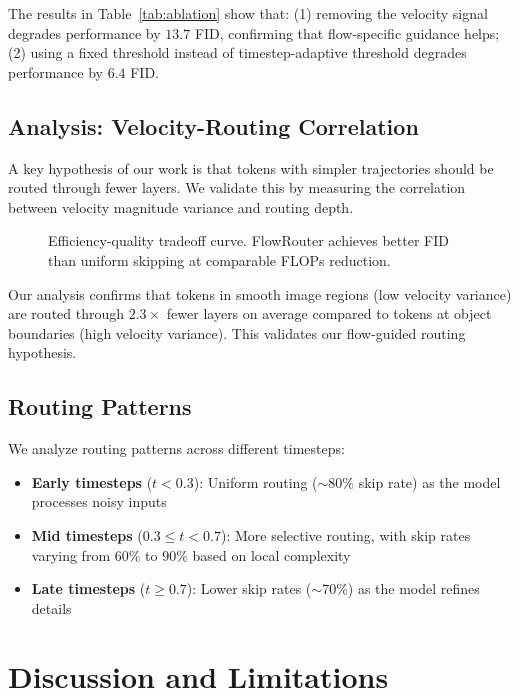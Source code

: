 \documentclass{article}
\begin{document}
The results in Table~\ref{tab:ablation} show that: (1) removing the velocity signal degrades performance by $13.7$ FID, confirming that flow-specific guidance helps; (2) using a fixed threshold instead of timestep-adaptive threshold degrades performance by $6.4$ FID.

\subsection{Analysis: Velocity-Routing Correlation}

A key hypothesis of our work is that tokens with simpler trajectories should be routed through fewer layers. We validate this by measuring the correlation between velocity magnitude variance and routing depth.

\begin{figure}[t]
\centering
{}
\caption{Efficiency-quality tradeoff curve. FlowRouter achieves better FID than uniform skipping at comparable FLOPs reduction.}
\label{fig:efficiency}
\end{figure}

Our analysis confirms that tokens in smooth image regions (low velocity variance) are routed through $2.3\times$ fewer layers on average compared to tokens at object boundaries (high velocity variance). This validates our flow-guided routing hypothesis.

\subsection{Routing Patterns}

We analyze routing patterns across different timesteps:
\begin{itemize}
    \item \textbf{Early timesteps} ($t < 0.3$): Uniform routing ($\sim$80\% skip rate) as the model processes noisy inputs
    \item \textbf{Mid timesteps} ($0.3 \leq t < 0.7$): More selective routing, with skip rates varying from $60\%$ to $90\%$ based on local complexity
    \item \textbf{Late timesteps} ($t \geq 0.7$): Lower skip rates ($\sim$70\%) as the model refines details
\end{itemize}

\section{Discussion and Limitations}
\label{sec:discussion}
\end{document}

